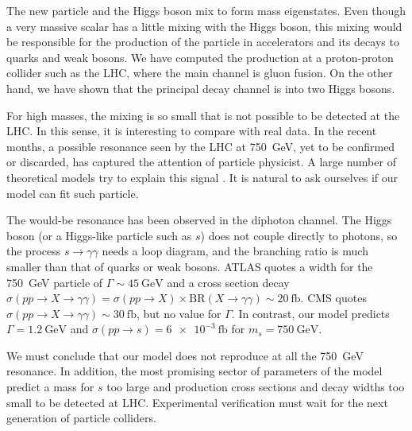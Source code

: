\documentclass[aps,prd,preprintnumbers,nofootinbibn,twocolumn]{revtex4}
\begin{document}
The new particle and the Higgs boson mix to form mass eigenstates. Even though a very massive scalar has a little mixing with the Higgs boson, this mixing would be responsible for the production of the particle in accelerators and its decays to quarks and weak bosons. We have computed the production at a proton-proton collider such as the LHC, where the main channel is gluon fusion. On the other hand, we have shown that the principal decay channel is into two Higgs bosons.

For high masses, the mixing is so small that is not possible to be detected at the LHC. In this sense, it is interesting to compare with real data. In the recent months, a possible resonance seen by the LHC at \SI{750}{\giga\electronvolt}\cite{ATLAS:2015, CMS:2015dxe, Aaboud:2016tru}, yet to be confirmed or discarded, has captured the attention of particle physicist. A large number of theoretical models try to explain this signal \cite{Staub:2016dxq}. It is natural to ask ourselves if our model can fit such particle.

The would-be resonance has been observed in the diphoton channel. The Higgs boson (or a Higgs-like particle such as $s$) does not couple directly to photons, so the process $s \to \gamma\gamma$ needs a loop diagram, and the branching ratio is much smaller than that of quarks or weak bosons. ATLAS quotes a width for the \SI{750}{\giga\electronvolt} particle of $\Gamma \sim \SI{45}{\giga\electronvolt}$ and a cross section decay $\sigma(pp \to X \to \gamma\gamma) = \sigma(pp\to X)\times \mathrm{BR}(X \to \gamma\gamma) \sim \SI{20}{\femto\barn}$. CMS quotes 
$\sigma(pp \to X \to \gamma\gamma) \sim \SI{30}{\femto\barn}$, but no value for $\Gamma$. In contrast, our model predicts $\Gamma = \SI{1.2}{\giga\electronvolt}$ and $\sigma(pp\to s)= \SI{6e-3}{\femto\barn}$ for $m_s = \SI{750}{\giga\electronvolt}$.

We must conclude that our model does not reproduce at all the \SI{750}{\giga\electronvolt} resonance. In addition, the most promising sector of parameters of the model predict a mass for $s$ too large and production cross sections and decay widths too small to be detected at LHC. Experimental verification must wait for the next generation of particle colliders.

 
\end{document}
